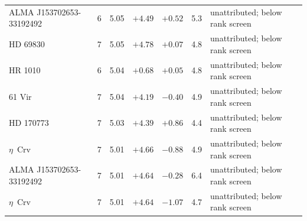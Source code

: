 \begin{tabular}{@{}llrrrrl@{}}
ALMA J153702653-33192492 & 6 & 5.05 & $+4.49$ & $+0.52$ & 5.3 & unattributed; below rank screen \\
HD 69830 & 7 & 5.05 & $+4.78$ & $+0.07$ & 4.8 & unattributed; below rank screen \\
HR 1010 & 6 & 5.04 & $+0.68$ & $+0.05$ & 4.8 & unattributed; below rank screen \\
61 Vir & 7 & 5.04 & $+4.19$ & $-0.40$ & 4.9 & unattributed; below rank screen \\
HD 170773 & 7 & 5.03 & $+4.39$ & $+0.86$ & 4.4 & unattributed; below rank screen \\
$\eta$~Crv & 7 & 5.01 & $+4.66$ & $-0.88$ & 4.9 & unattributed; below rank screen \\
ALMA J153702653-33192492 & 7 & 5.01 & $+4.64$ & $-0.28$ & 6.4 & unattributed; below rank screen \\
$\eta$~Crv & 7 & 5.01 & $+4.64$ & $-1.07$ & 4.7 & unattributed; below rank screen \\
\bottomrule
\end{tabular}
